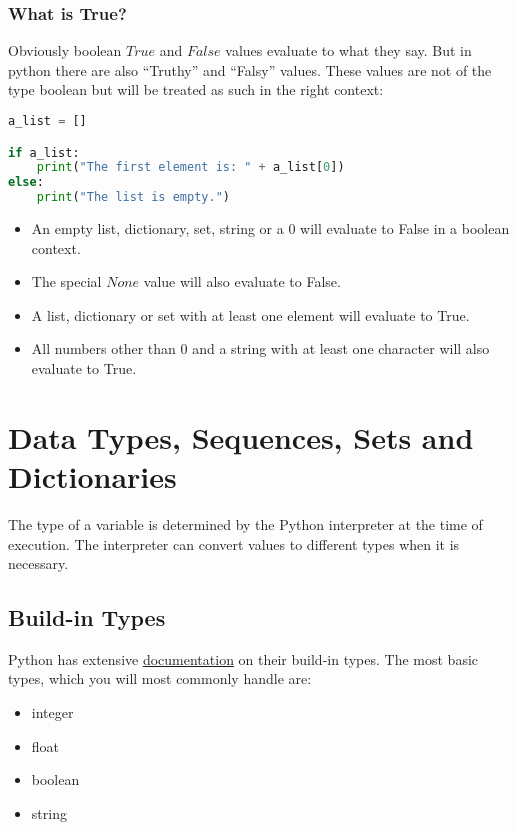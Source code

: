 \documentclass{article}
\begin{document}
\subsubsection{What is True?}

Obviously boolean $True$ and $False$ values evaluate to what they say.
But in python there are also ``Truthy'' and ``Falsy'' values.
These values are not of the type boolean but will be treated as such in the right context:

\begin{lstlisting}[language=Python]
a_list = []

if a_list:
    print("The first element is: " + a_list[0])
else:
    print("The list is empty.")
\end{lstlisting}

\begin{itemize}
    \item An empty list, dictionary, set, string or a 0 will evaluate to False in a boolean context.
    \item The special $None$ value will also evaluate to False.
    \item A list, dictionary or set with at least one element will evaluate to True.
    \item All numbers other than 0 and a string with at least one character will also evaluate to True.
\end{itemize}






\section{Data Types, Sequences, Sets and Dictionaries}

The type of a variable is determined by the Python interpreter at the time
of execution.
The interpreter can convert values to different types when it is necessary.

\subsection{Build-in Types}

Python has extensive \href{https://docs.python.org/3/library/stdtypes.html}{documentation}
on their build-in types.
The most basic types, which you will most commonly handle are:

\begin{itemize}
    \item integer
    \item float
    \item boolean
    \item string
\end{itemize}
\end{document}
